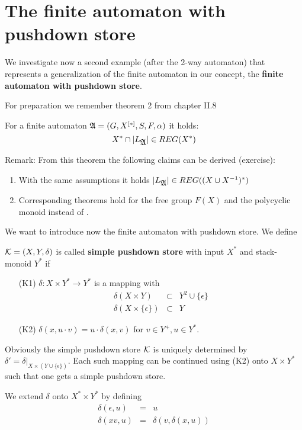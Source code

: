 \section{The finite automaton with pushdown store}

We investigate now a second example (after the 2-way automaton) that represents
a generalization of the finite automaton in our concept, the {\bf finite
automaton with pushdown store}.

For preparation we remember theorem 2 from chapter II.8

\begin{theorem}
For a finite automaton $\mbox{$\mathfrak{A}$} = (G, \mbox{${X}^{[*]}$}, S, F, \alpha)$ it holds:
\[ X^* \cap |L_{\mbox{$\mathfrak{A}$}}| \in REG(X^*) \]
\end{theorem}

Remark: From this theorem the following claims can be derived (exercise):
\begin{enumerate}
  \item With the same assumptions it holds $|L_{\mbox{$\mathfrak{A}$}}| \in REG((X\cup
  X^{-1})^*)$
  \item Corresponding theorems hold for the free group $F(X)$ and the polycyclic
  monoid  instead of .
\end{enumerate}
  
We want to introduce now the finite automaton with pushdown store. We define
\begin{definition}
$\mbox{$\mathcal{K}$} = (X, Y, \delta)$ is called {\bf simple pushdown store} with
input $X^*$ and stack-monoid $Y^*$ if
\begin{itemize}
  \item[(K1)] $\delta: X \times Y^* \to Y^*$ is a mapping with
  \begin{eqnarray*}
  \delta(X \times Y) & \subset & Y^2 \cup \{\epsilon\} \\
  \delta(X \times \{\epsilon\}) & \subset & Y
  \end{eqnarray*} 
  \item[(K2)] $\delta(x, u \cdot v) = u \cdot \delta(x, v)$ for $v \in Y^+,u \in
  Y^*$.
\end{itemize}
\end{definition} 

Obviously the simple pushdown store $\mbox{$\mathcal{K}$}$ is uniquely determined by
$\delta' = \delta |_{X \times (Y \cup \{\epsilon\})}$. Each such mapping can be
continued using (K2) onto $X \times Y^*$ such that one gets a simple
pushdown store.

We extend $\delta$ onto $X^* \times Y^*$ by defining
\begin{eqnarray*}
\delta(\epsilon, u) & = & u \\
\delta(x v, u) & = & \delta(v,  \delta(x,u))
\end{eqnarray*}

